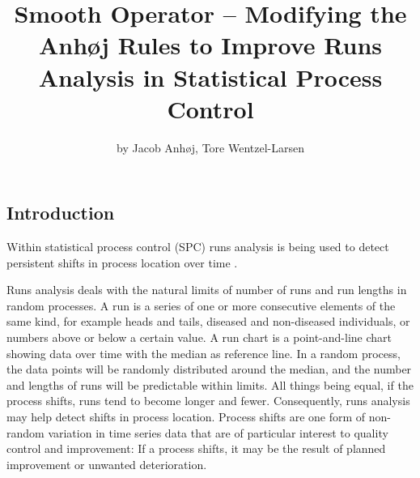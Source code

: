 \title{Smooth Operator -- Modifying the Anhøj Rules to Improve Runs Analysis in
Statistical Process Control}
\author{by Jacob Anhøj, Tore Wentzel-Larsen}

\maketitle



\hypertarget{introduction}{%
\subsection{Introduction}\label{introduction}}

Within statistical process control (SPC) runs analysis is being used to
detect persistent shifts in process location over time
\citep{anhoej2018}.

Runs analysis deals with the natural limits of number of runs and run
lengths in random processes. A run is a series of one or more
consecutive elements of the same kind, for example heads and tails,
diseased and non-diseased individuals, or numbers above or below a
certain value. A run chart is a point-and-line chart showing data over
time with the median as reference line. In a random process, the data
points will be randomly distributed around the median, and the number
and lengths of runs will be predictable within limits. All things being
equal, if the process shifts, runs tend to become longer and fewer.
Consequently, runs analysis may help detect shifts in process location.
Process shifts are one form of non-random variation in time series data
that are of particular interest to quality control and improvement: If a
process shifts, it may be the result of planned improvement or unwanted
deterioration.

